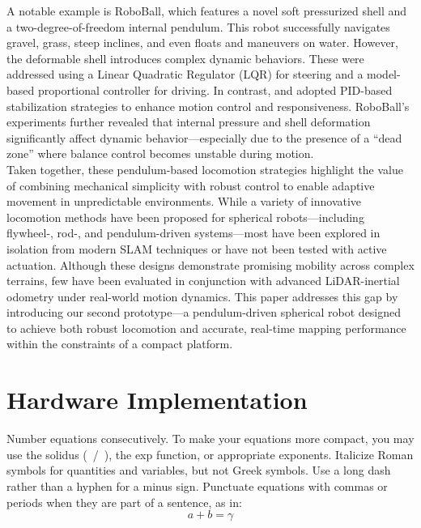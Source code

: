 \documentclass[conference]{IEEEtran}
\begin{document}
\hspace*{1em}A notable example is RoboBall\cite{roboball}, which features a novel soft pressurized shell and a two-degree-of-freedom internal pendulum. This robot successfully navigates gravel, grass, steep inclines, and even floats and maneuvers on water. However, the deformable shell introduces complex dynamic behaviors. These were addressed using a Linear Quadratic Regulator (LQR) for steering and a model-based proportional controller for driving. In contrast, \cite{novelsphere} and \cite{pendulum_sphere} adopted PID-based stabilization strategies to enhance motion control and responsiveness. RoboBall’s experiments further revealed that internal pressure and shell deformation significantly affect dynamic behavior—especially due to the presence of a “dead zone” where balance control becomes unstable during motion.\\
\hspace*{1em}Taken together, these pendulum-based locomotion strategies highlight the value of combining mechanical simplicity with robust control to enable adaptive movement in unpredictable environments. While a variety of innovative locomotion methods have been proposed for spherical robots—including flywheel-, rod-, and pendulum-driven systems—most have been explored in isolation from modern SLAM techniques or have not been tested with active actuation. Although these designs demonstrate promising mobility across complex terrains, few have been evaluated in conjunction with advanced LiDAR-inertial odometry under real-world motion dynamics. This paper addresses this gap by introducing our second prototype—a pendulum-driven spherical robot designed to achieve both robust locomotion and accurate, real-time mapping performance within the constraints of a compact platform.

\section{Hardware Implementation}
Number equations consecutively. To make your 
equations more compact, you may use the solidus (~/~), the exp function, or 
appropriate exponents. Italicize Roman symbols for quantities and variables, 
but not Greek symbols. Use a long dash rather than a hyphen for a minus 
sign. Punctuate equations with commas or periods when they are part of a 
sentence, as in:
\begin{equation}
a+b=\gamma\label{eq}
\end{equation}
\end{document}

